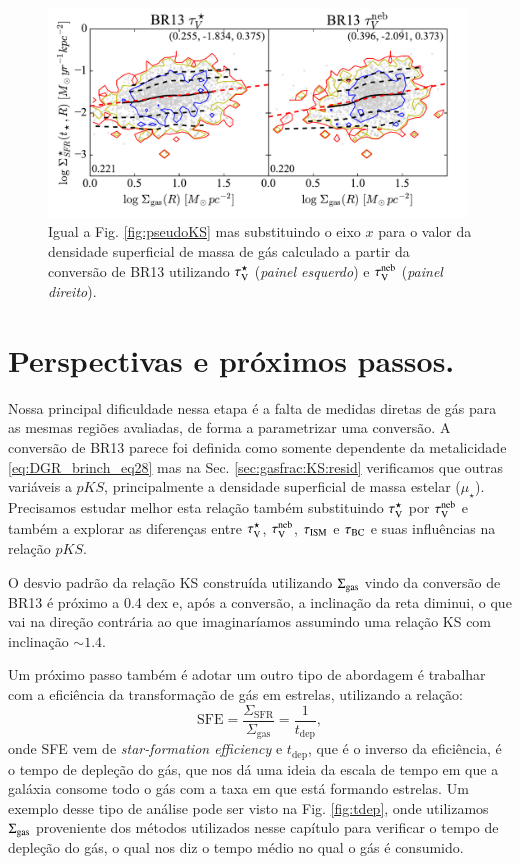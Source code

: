 \begin{figure}
	\centering
	\includegraphics[width=0.99\textwidth]{figuras/KS.pdf}
	\caption[Relação de Kennicut-Schmidt.]
	{Igual a Fig. \ref{fig:pseudoKS} mas substituindo o eixo $x$ para o valor da densidade superficial
de massa de gás calculado a partir da conversão de BR13 utilizando $\tau_{\mathrm{V}}^\star$ ({\em painel esquerdo})
e $\tau_{\mathrm{V}}^{\mathrm{neb}}$ ({\em painel direito}).}
	\label{fig:KS}
\end{figure}

\section{Perspectivas e próximos passos.}
\label{sec:gasfrac:nextsteps}

Nossa principal dificuldade nessa etapa é a falta de medidas diretas de gás para as mesmas regiões
avaliadas, de forma a parametrizar uma conversão. A conversão de BR13 parece foi definida como
somente dependente da metalicidade \eqref{eq:DGR_brinch_eq28} mas na Sec. \ref{sec:gasfrac:KS:resid}
verificamos que outras variáveis a $pKS$, principalmente a densidade superficial de massa estelar
($\mu_\star$). Precisamos estudar melhor esta relação também substituindo $\tau_{\mathrm{V}}^\star$ por $\tau_{\mathrm{V}}^{\mathrm{neb}}$ e
também a explorar as diferenças entre $\tau_{\mathrm{V}}^\star$, $\tau_{\mathrm{V}}^{\mathrm{neb}}$, $\tau_{\mathrm{ISM}}$ e $\tau_{\mathrm{BC}}$ e suas influências na
relação $pKS$. 

O desvio padrão da relação KS construída utilizando $\Sigma_{\mathrm{gas}}$ vindo da conversão de
BR13 é próximo a 0.4 dex e, após a conversão, a inclinação da reta diminui, o que vai na direção
contrária ao que imaginaríamos assumindo uma relação KS com inclinação $\sim 1.4$. 

Um próximo passo também é adotar um outro tipo de abordagem é trabalhar com a eficiência da
transformação de gás em estrelas, utilizando a relação:
\begin{equation}
	\mathrm{SFE} = \frac{\Sigma_{\mathrm{SFR}}}{\Sigma_{\mathrm{gas}}} = \frac{1}{t_{\mathrm{dep}}},
	\label{eq:SFE}
\end{equation}
\noindent onde SFE vem de {\em star-formation efficiency} e $t_{\mathrm{dep}}$, que é o inverso da
eficiência, é o tempo de depleção do gás, que nos dá uma ideia da escala de tempo em que a galáxia
consome todo o gás com a taxa em que está formando estrelas. Um exemplo desse tipo de análise pode
ser visto na Fig. \ref{fig:tdep}, onde utilizamos $\Sigma_{\mathrm{gas}}$ proveniente dos métodos utilizados
nesse capítulo para verificar o tempo de depleção do gás, o qual nos diz o tempo médio no qual o
gás é consumido.

